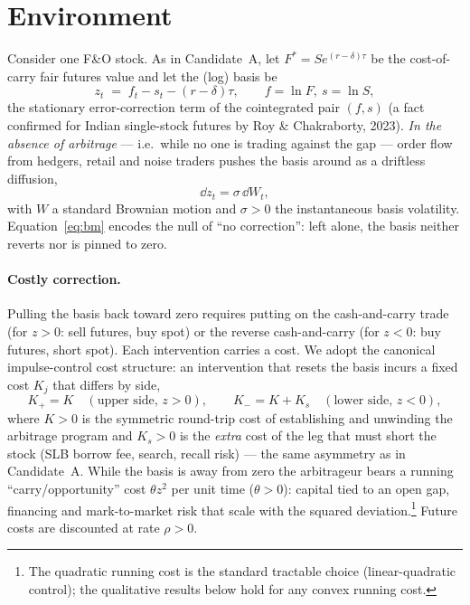\documentclass[11pt,a4paper]{article}
\theoremstyle{plain}
\theoremstyle{definition}
\theoremstyle{remark}
\begin{document}
\section{Environment}\label{sec:env}
Consider one F\&O stock. As in Candidate~A, let $F^\ast=S e^{(r-\delta)\tau}$ be the cost-of-carry fair futures value and let the (log) basis be
\begin{equation}
z_t \;=\; f_t - s_t - (r-\delta)\tau, \qquad f=\ln F,\ s=\ln S,
\end{equation}
the stationary error-correction term of the cointegrated pair $(f,s)$ (a fact confirmed for Indian single-stock futures by Roy \& Chakraborty, 2023). \emph{In the absence of arbitrage} --- i.e.\ while no one is trading against the gap --- order flow from hedgers, retail and noise traders pushes the basis around as a driftless diffusion,
\begin{equation}
\dd z_t = \sigma\,\dd W_t, \label{eq:bm}
\end{equation}
with $W$ a standard Brownian motion and $\sigma>0$ the instantaneous basis volatility. Equation~\eqref{eq:bm} encodes the null of ``no correction'': left alone, the basis neither reverts nor is pinned to zero.

\paragraph{Costly correction.} Pulling the basis back toward zero requires putting on the cash-and-carry trade (for $z>0$: sell futures, buy spot) or the reverse cash-and-carry (for $z<0$: buy futures, short spot). Each intervention carries a cost. We adopt the canonical impulse-control cost structure: an intervention that resets the basis incurs a fixed cost $K_j$ that differs by side,
\begin{equation}
K_{+} = K \quad (\text{upper side, } z>0), \qquad K_{-} = K + K_s \quad (\text{lower side, } z<0), \label{eq:Kcosts}
\end{equation}
where $K>0$ is the symmetric round-trip cost of establishing and unwinding the arbitrage program and $K_s>0$ is the \emph{extra} cost of the leg that must short the stock (SLB borrow fee, search, recall risk) --- the same asymmetry as in Candidate~A. While the basis is away from zero the arbitrageur bears a running ``carry/opportunity'' cost $\theta z^2$ per unit time ($\theta>0$): capital tied to an open gap, financing and mark-to-market risk that scale with the squared deviation.\footnote{The quadratic running cost is the standard tractable choice (linear-quadratic control); the qualitative results below hold for any convex running cost.} Future costs are discounted at rate $\rho>0$.
\end{document}
